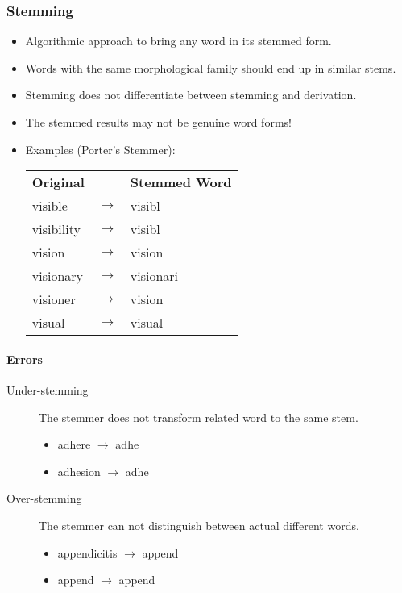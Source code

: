 			\subsubsection{Stemming} %
				\begin{itemize}
					\item Algorithmic approach to bring any word in its stemmed form.
					\item Words with the same morphological family should end up in similar stems.
					\item Stemming does not differentiate between stemming and derivation.
					\item The stemmed results may not be genuine word forms!
					\item Examples (Porter's Stemmer):
						\begin{table}[H]
							\centering
							\begin{tabular}{l c l}
								\textbf{Original} &                 & \textbf{Stemmed Word} \\
								visible           & \(\rightarrow\) & visibl                \\
								visibility        & \(\rightarrow\) & visibl                \\
								vision            & \(\rightarrow\) & vision                \\
								visionary         & \(\rightarrow\) & visionari             \\
								visioner          & \(\rightarrow\) & vision                \\
								visual            & \(\rightarrow\) & visual
							\end{tabular}
						\end{table}
				\end{itemize}

				\paragraph{Errors} %
					\begin{description}
						\item[Under-stemming] The stemmer does not transform related word to the same stem.
							\begin{itemize}
								\item adhere \(\rightarrow\) adhe
								\item adhesion \(\rightarrow\) adhe
							\end{itemize}
						\item[Over-stemming] The stemmer can not distinguish between actual different words.
							\begin{itemize}
								\item appendicitis \(\rightarrow\) append
								\item append \(\rightarrow\) append
							\end{itemize}
					\end{description}

